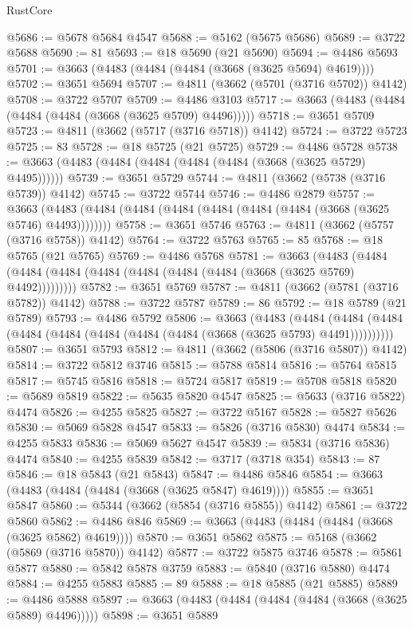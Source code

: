 \begin{lexlean}{RustCore}
\begin{coremodule}
@5686 := @5678 @5684 @4547
@5688 := @5162 (@5675 @5686)
@5689 := @3722 @5688
@5690 := 81
@5693 := @18 @5690 (@21 @5690)
@5694 := @4486 @5693
@5701 := @3663 (@4483 (@4484 (@4484 (@3668 (@3625 @5694) @4619))))
@5702 := @3651 @5694
@5707 := @4811 (@3662 (@5701 (@3716 @5702)) @4142)
@5708 := @3722 @5707
@5709 := @4486 @3103
@5717 := @3663 (@4483 (@4484 (@4484 (@4484 (@3668 (@3625 @5709) @4496)))))
@5718 := @3651 @5709
@5723 := @4811 (@3662 (@5717 (@3716 @5718)) @4142)
@5724 := @3722 @5723
@5725 := 83
@5728 := @18 @5725 (@21 @5725)
@5729 := @4486 @5728
@5738 := @3663 (@4483 (@4484 (@4484 (@4484 (@4484 (@3668 (@3625 @5729) @4495))))))
@5739 := @3651 @5729
@5744 := @4811 (@3662 (@5738 (@3716 @5739)) @4142)
@5745 := @3722 @5744
@5746 := @4486 @2879
@5757 := @3663 (@4483 (@4484 (@4484 (@4484 (@4484 (@4484 (@4484 (@3668 (@3625 @5746) @4493))))))))
@5758 := @3651 @5746
@5763 := @4811 (@3662 (@5757 (@3716 @5758)) @4142)
@5764 := @3722 @5763
@5765 := 85
@5768 := @18 @5765 (@21 @5765)
@5769 := @4486 @5768
@5781 := @3663
    (@4483 (@4484 (@4484 (@4484 (@4484 (@4484 (@4484 (@4484 (@3668 (@3625 @5769) @4492)))))))))
@5782 := @3651 @5769
@5787 := @4811 (@3662 (@5781 (@3716 @5782)) @4142)
@5788 := @3722 @5787
@5789 := 86
@5792 := @18 @5789 (@21 @5789)
@5793 := @4486 @5792
@5806 := @3663
    (@4483
      (@4484 (@4484 (@4484 (@4484 (@4484 (@4484 (@4484 (@4484 (@3668 (@3625 @5793) @4491))))))))))
@5807 := @3651 @5793
@5812 := @4811 (@3662 (@5806 (@3716 @5807)) @4142)
@5814 := @3722 @5812 @3746
@5815 := @5788 @5814
@5816 := @5764 @5815
@5817 := @5745 @5816
@5818 := @5724 @5817
@5819 := @5708 @5818
@5820 := @5689 @5819
@5822 := @5635 @5820 @4547
@5825 := @5633 (@3716 @5822) @4474
@5826 := @4255 @5825
@5827 := @3722 @5167
@5828 := @5827 @5626
@5830 := @5069 @5828 @4547
@5833 := @5826 (@3716 @5830) @4474
@5834 := @4255 @5833
@5836 := @5069 @5627 @4547
@5839 := @5834 (@3716 @5836) @4474
@5840 := @4255 @5839
@5842 := @3717 (@3718 @354)
@5843 := 87
@5846 := @18 @5843 (@21 @5843)
@5847 := @4486 @5846
@5854 := @3663 (@4483 (@4484 (@4484 (@3668 (@3625 @5847) @4619))))
@5855 := @3651 @5847
@5860 := @5344 (@3662 (@5854 (@3716 @5855)) @4142)
@5861 := @3722 @5860
@5862 := @4486 @846
@5869 := @3663 (@4483 (@4484 (@4484 (@3668 (@3625 @5862) @4619))))
@5870 := @3651 @5862
@5875 := @5168 (@3662 (@5869 (@3716 @5870)) @4142)
@5877 := @3722 @5875 @3746
@5878 := @5861 @5877
@5880 := @5842 @5878 @3759
@5883 := @5840 (@3716 @5880) @4474
@5884 := @4255 @5883
@5885 := 89
@5888 := @18 @5885 (@21 @5885)
@5889 := @4486 @5888
@5897 := @3663 (@4483 (@4484 (@4484 (@4484 (@3668 (@3625 @5889) @4496)))))
@5898 := @3651 @5889

\end{coremodule}
\end{lexlean}

